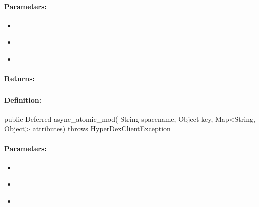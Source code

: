 \paragraph{Parameters:}
\begin{itemize}[noitemsep]
\item {}\\

\item {}\\

\item {}\\

\end{itemize}

\paragraph{Returns:}


\pagebreak
\subsubsection{}
\label{api:java:async_atomic_mod}


\paragraph{Definition:}
\begin{javacode}
public Deferred async_atomic_mod(
        String spacename,
        Object key,
        Map<String, Object> attributes) throws HyperDexClientException
\end{javacode}

\paragraph{Parameters:}
\begin{itemize}[noitemsep]
\item {}\\

\item {}\\

\item {}\\

\end{itemize}

